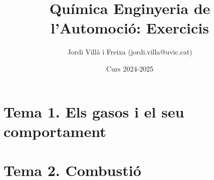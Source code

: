\documentclass[12pt]{article}
\title{Química Enginyeria de l'Automoció: Exercicis}
\date{Curs 2024-2025}
\author{Jordi Vill\`a i Freixa (jordi.villa@uvic.cat)}
\begin{document}
\maketitle
\tableofcontents
\section{Tema 1. Els gasos i el seu comportament}


\section{Tema 2. Combustió}


\printbibliography
\end{document}
